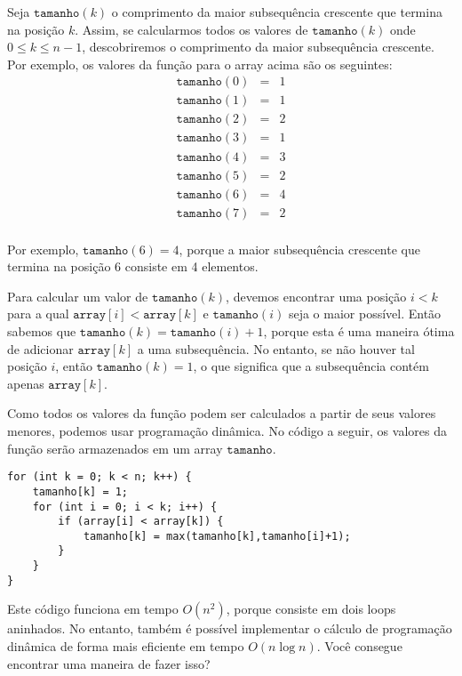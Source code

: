 Seja $\texttt{tamanho}(k)$ o comprimento da
maior subsequência crescente
que termina na posição $k$.
Assim, se calcularmos todos os valores de
$\texttt{tamanho}(k)$ onde $0 \le k \le n-1$,
descobriremos o comprimento da
maior subsequência crescente.
Por exemplo, os valores da função
para o array acima são os seguintes:
\[
\begin{array}{lcl}
\texttt{tamanho}(0) & = & 1 \\
\texttt{tamanho}(1) & = & 1 \\
\texttt{tamanho}(2) & = & 2 \\
\texttt{tamanho}(3) & = & 1 \\
\texttt{tamanho}(4) & = & 3 \\
\texttt{tamanho}(5) & = & 2 \\
\texttt{tamanho}(6) & = & 4 \\
\texttt{tamanho}(7) & = & 2 \\
\end{array}
\]

Por exemplo, $\texttt{tamanho}(6)=4$,
porque a maior subsequência crescente
que termina na posição 6 consiste em 4 elementos.

Para calcular um valor de $\texttt{tamanho}(k)$,
devemos encontrar uma posição $i<k$
para a qual $\texttt{array}[i]<\texttt{array}[k]$
e $\texttt{tamanho}(i)$ seja o maior possível.
Então sabemos que
$\texttt{tamanho}(k)=\texttt{tamanho}(i)+1$,
porque esta é uma maneira ótima de adicionar
$\texttt{array}[k]$ a uma subsequência.
No entanto, se não houver tal posição $i$,
então $\texttt{tamanho}(k)=1$,
o que significa que a subsequência contém apenas
$\texttt{array}[k]$.

Como todos os valores da função podem ser calculados
a partir de seus valores menores,
podemos usar programação dinâmica.
No código a seguir, os valores
da função serão armazenados em um array
$\texttt{tamanho}$.

\begin{lstlisting}
for (int k = 0; k < n; k++) {
    tamanho[k] = 1;
    for (int i = 0; i < k; i++) {
        if (array[i] < array[k]) {
            tamanho[k] = max(tamanho[k],tamanho[i]+1);
        }
    }
}
\end{lstlisting}

Este código funciona em tempo $O(n^2)$,
porque consiste em dois loops aninhados.
No entanto, também é possível implementar
o cálculo de programação dinâmica
de forma mais eficiente em tempo $O(n \log n)$.
Você consegue encontrar uma maneira de fazer isso?


